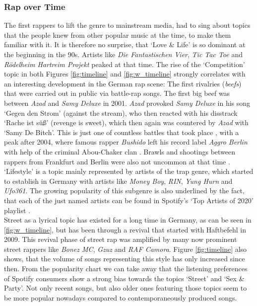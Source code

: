 \documentclass[conference]{IEEEtran}
\begin{document}
\subsubsection{Rap over Time} \label{discussion_timeline}
The first rappers to lift the genre to mainstream media, had to sing about topics that the people knew from other popular music at the time, to make them familiar with it. It is therefore no surprise, that {\lq}Love \& Life{\rq} is so dominant at the beginning in the 90s. Artists like \textit{Die Fantastischen Vier}, \textit{Tic Tac Toe} and \textit{R\"odelheim Hartreim Projekt} peaked at that time.
The rise of the {\lq}Competition{\rq} topic in both Figures \ref{fig:timeline} and \ref{fig:w_timeline} strongly correlates with an interesting development in the German rap scene: The first rivalries (\textit{beefs}) that were carried out in public via battle-rap songs. The first big beef was between \textit{Azad} and \textit{Samy Deluxe} in 2001. \textit{Azad} provoked \textit{Samy Deluxe} in his song {\lq}Gegen den Strom{\rq} (against the stream), who then reacted with his disstrack {\lq}Rache ist s\"u\ss{\rq} (revenge is sweet), which then again was countered by \textit{Azad} with {\lq}Samy De Bitch{\rq}. This is just one of countless battles that took place \cite{battles}, with a peak after 2004, where famous rapper \textit{Bushido} left his record label \textit{Aggro Berlin} with help of the criminal Abou-Chaker clan \cite{abou-chaker}. Brawls and shootings between rappers from Frankfurt and Berlin were also not uncommon at that time \cite{schlaegerei}.\\
{\lq}Lifestyle{\rq} is a topic mainly represented by artists of the trap genre, which started to establish in Germany with artists like \textit{Money Boy}, \textit{RIN}, \textit{Yung Hurn} and \textit{Ufo361}. The growing popularity of this subgenre is also underlined by the fact, that each of the just named artists can be found in Spotify's {\lq}Top Artists of 2020{\rq} playlist \cite{spotify_2020}.\\
Street as a lyrical topic has existed for a long time in Germany, as can be seen in \ref{fig:w_timeline}, but has been through a revival that started with Haftbefehl in 2009. This revival phase of street rap was amplified by many now prominent street rappers like \textit{Bonez MC}, \textit{Gzuz} and \textit{RAF Camora}\cite{strassenrap}. Figure \ref{fig:timeline} also shows, that the volume of songs representing this style has only increased since then. From the popularity chart we can take away that the listening preferences of Spotify consumers show a strong bias towards the topics {\lq}Street{\rq} and {\lq}Sex \& Party{\rq}. Not only recent songs, but also older ones featuring those topics seem to be more popular nowadays compared to contemporaneously produced songs.
\end{document}
